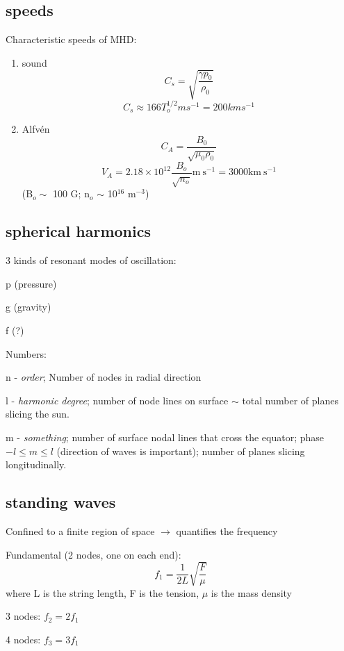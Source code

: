 \documentclass[12pt]{article}
\begin{document}
\subsection*{speeds}
Characteristic speeds of MHD:
\begin{enumerate}
    \item sound
        $$ C_s = \sqrt{\frac{\gamma p_0}{\rho_0}} $$
        $$ C_s \approx 166 T_o^{1/2} m s^{-1} = 200 km s^{-1}$$
    \item Alfv\'en
        $$ C_A = \frac{B_0}{\sqrt{\mu_0\rho_0}} $$
        $$ V_A = 2.18\times10^{12}\frac{B_o}{\sqrt{n_o}}
        \textrm{m}\ \textrm{s}^{-1}
               = 3000 \textrm{km}\ \textrm{s}^{-1} $$
               (B$_o \sim$ 100 G; n$_o$ $\sim$ 10$^{16}$ m$^{-3}$)
\end{enumerate}

\subsection*{spherical harmonics}
3 kinds of resonant modes of oscillation:
\begin{itemize*}
    \item p (pressure)
    \item g (gravity)
    \item f (?)
\end{itemize*}
Numbers:
\begin{itemize*}
    \item n - \emph{order}; Number of nodes in radial direction
    \item l - \emph{harmonic degree}; number of node lines on
        surface $\sim$ total number of planes slicing the sun.
    \item m - \emph{something}; number of surface nodal lines that
        cross the equator; phase\\
        $-l \leq m \leq l$ (direction of waves is important); number of
        planes slicing longitudinally.
\end{itemize*}

\subsection*{standing waves}
Confined to a finite region of space $\rightarrow$ quantifies the frequency
\begin{itemize*}
    \item Fundamental (2 nodes, one on each end):
        $$f_1 = \frac{1}{2L}\sqrt{\frac{F}{\mu}}$$
        where L is the string length, F is the tension, $\mu$ is the mass density
    \item 3 nodes: $f_2 = 2f_1$
    \item 4 nodes: $f_3 = 3f_1$
\end{itemize*}
\end{document}
